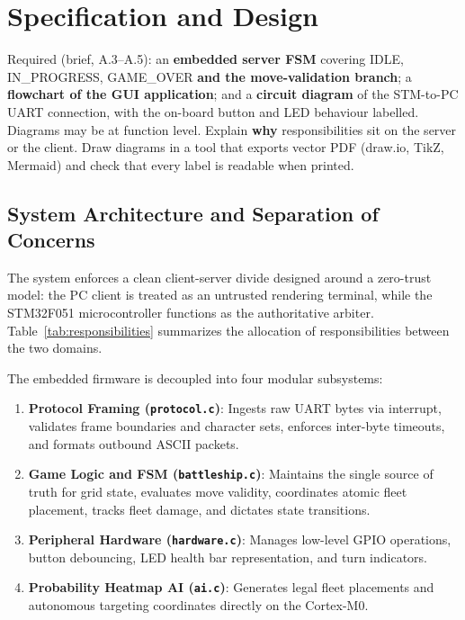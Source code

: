 \section{Specification and Design}
\label{sec:design}

\begin{guidance}
Required (brief, A.3--A.5): an \textbf{embedded server FSM} covering IDLE,
IN\_PROGRESS, GAME\_OVER \textbf{and the move-validation branch}; a
\textbf{flowchart of the GUI application}; and a \textbf{circuit diagram} of the
STM-to-PC UART connection, with the on-board button and LED behaviour labelled.
Diagrams may be at function level. Explain \textbf{why} responsibilities sit on
the server or the client. Draw diagrams in a tool that exports vector PDF
(draw.io, TikZ, Mermaid) and check that every label is readable when printed.
\end{guidance}

\subsection{System Architecture and Separation of Concerns}
The system enforces a clean client-server divide designed around a zero-trust model: the PC client is treated as an untrusted rendering terminal, while the STM32F051 microcontroller functions as the authoritative arbiter. Table~\ref{tab:responsibilities} summarizes the allocation of responsibilities between the two domains.

The embedded firmware is decoupled into four modular subsystems:
\begin{enumerate}
    \item \textbf{Protocol Framing (\texttt{protocol.c})}: Ingests raw UART bytes via interrupt, validates frame boundaries and character sets, enforces inter-byte timeouts, and formats outbound ASCII packets.
    \item \textbf{Game Logic and FSM (\texttt{battleship.c})}: Maintains the single source of truth for grid state, evaluates move validity, coordinates atomic fleet placement, tracks fleet damage, and dictates state transitions.
    \item \textbf{Peripheral Hardware (\texttt{hardware.c})}: Manages low-level GPIO operations, button debouncing, LED health bar representation, and turn indicators.
    \item \textbf{Probability Heatmap AI (\texttt{ai.c})}: Generates legal fleet placements and autonomous targeting coordinates directly on the Cortex-M0.
\end{enumerate}


